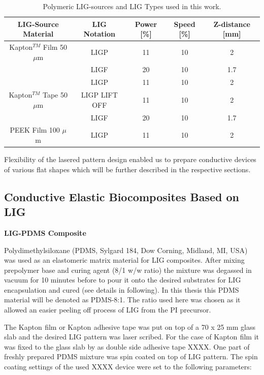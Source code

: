\begin{table}[H]
\centering
    \caption{Polymeric LIG-sources and LIG Types used in this work.}
    \label{tab:ligtypes} 
\medskip
\medskip
\begin{tabular}{c| c| c| c| c } 

   LIG-Source Material & LIG Notation & Power [\%] & Speed [\%] & Z-distance [mm] \\[13px]
   \hline
     Kapton$^{TM}$ Film 50 $\mu$m  & LIGP   & 11 & 10  & 2 \\[13px]
                                  & LIGF   & 20 & 10 & 1.7 \\[13px]
   \hline
                                  & LIGP   & 11 & 10 & 2 \\[13px]
    Kapton$^{TM}$ Tape 50 $\mu$m               & LIGP LIFT OFF  & 11 & 10 & 2 \\[13px]
                                  & LIGF   & 20 & 10 & 1.7 \\[13px]
   \hline
     PEEK Film 100 $\mu$m           & LIGP   & 11 & 10 & 2 \\[13px]

\end{tabular}
\end{table}


Flexibility of the lasered pattern design enabled us to prepare conductive devices of various flat shapes which will be further described in the respective sections.

\subsection{Conductive Elastic Biocomposites Based on LIG}
\label{composites_preparation}

\medskip
\textbf{LIG-PDMS Composite}

Polydimethylsiloxane (PDMS, Sylgard 184, Dow Corning, Midland, MI, USA) was used as an elastomeric matrix material for LIG  composites. After mixing prepolymer base and curing agent (8/1 w/w ratio) the mixture was degassed in vacuum for 10 minutes before to pour it onto the desired substrates for LIG encapsulation and cured (see details in following). In this thesis this PDMS material will be denoted as PDMS-8:1. The ratio used here was chosen as it allowed an easier peeling off process of LIG from the PI precursor.  

The Kapton$^{}$ film or Kapton$^{}$ adhesive tape was put on top of a 70 x 25 mm glass slab and the desired LIG pattern was laser scribed. For the case of Kapton$^{}$ film it was fixed to the glass slab by as double side adhesive tape XXXX. One part of freshly prepared PDMS mixture was spin coated on top of LIG pattern. The spin coating settings of the used XXXX device were set to the following parameters:

